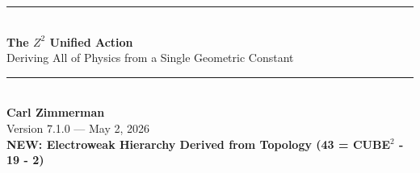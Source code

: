 \documentclass[11pt,a4paper]{article}
\theoremstyle{plain}
\theoremstyle{definition}
\theoremstyle{remark}
\begin{document}

\begin{center}
\rule{\textwidth}{1.5pt}\\[0.5cm]
{\LARGE\bfseries The $Z^2$ Unified Action}\\[0.3cm]
{\Large Deriving All of Physics from a Single Geometric Constant}\\[0.5cm]
\rule{\textwidth}{1.5pt}\\[0.8cm]

{\large\bfseries Carl Zimmerman}\\[0.3cm]
Version 7.1.0 --- May 2, 2026\\[0.3cm]
\textcolor{newcolor}{\textbf{NEW: Electroweak Hierarchy Derived from Topology (43 = CUBE$^2$ - 19 - 2)}}
\end{center}

\vspace{1cm}

\end{document}
